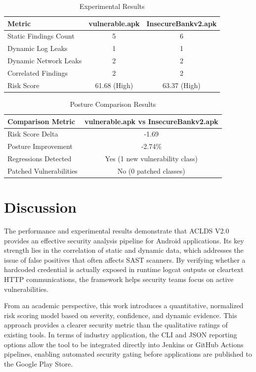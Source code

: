 \documentclass[conference]{
IEEEtran}
\begin{document}
\begin{table}[h]
\caption{Experimental Results}
\centering
\begin{tabular}{lcc}
\toprule
\textbf{Metric} & \textbf{vulnerable.apk} & \textbf{InsecureBankv2.apk} \\
\midrule
Static Findings Count & 5 & 6 \\
Dynamic Log Leaks & 1 & 1 \\
Dynamic Network Leaks & 2 & 2 \\
Correlated Findings & 2 & 2 \\
Risk Score & 61.68 (High) & 63.37 (High) \\
\bottomrule
\end{tabular}
\end{table}

\begin{table}[h]
\caption{Posture Comparison Results}
\centering
\begin{tabular}{lc}
\toprule
\textbf{Comparison Metric} & \textbf{vulnerable.apk vs InsecureBankv2.apk} \\
\midrule
Risk Score Delta & -1.69 \\
Posture Improvement & -2.74\% \\
Regressions Detected & Yes (1 new vulnerability class) \\
Patched Vulnerabilities & No (0 patched classes) \\
\bottomrule
\end{tabular}
\end{table}

\section{Discussion}
The performance and experimental results demonstrate that ACLDS V2.0 provides an effective security analysis pipeline for Android applications. Its key strength lies in the correlation of static and dynamic data, which addresses the issue of false positives that often affects SAST scanners. By verifying whether a hardcoded credential is actually exposed in runtime logcat outputs or cleartext HTTP communications, the framework helps security teams focus on active vulnerabilities.

From an academic perspective, this work introduces a quantitative, normalized risk scoring model based on severity, confidence, and dynamic evidence. This approach provides a clearer security metric than the qualitative ratings of existing tools. In terms of industry application, the CLI and JSON reporting options allow the tool to be integrated directly into Jenkins or GitHub Actions pipelines, enabling automated security gating before applications are published to the Google Play Store.
\end{document}
